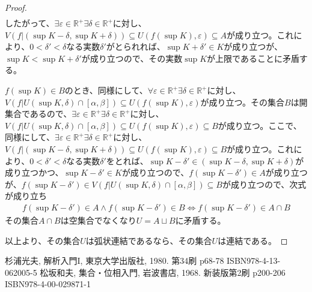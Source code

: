 \documentclass[dvipdfmx]{jsarticle}
\begin{document}
\begin{proof}
\begin{align*}
\end{align*}
したがって、$\exists\varepsilon \in \mathbb{R}^{+}\exists\delta \in \mathbb{R}^{+}$に対し、$V\left( f|\left( \sup K - \delta,\sup K + \delta \right) \right) \subseteq U\left( f\left( \sup K \right),\varepsilon \right) \subseteq A$が成り立つ。これにより、$0 < \delta' < \delta$なる実数$\delta'$がとられれば、$\sup K + \delta' \in K$が成り立つが、$\sup K < \sup K + \delta'$が成り立つので、その実数$\sup K$が上限であることに矛盾する。\par
$f\left( \sup K \right) \in B$のとき、同様にして、$\forall\varepsilon \in \mathbb{R}^{+}\exists\delta \in \mathbb{R}^{+}$に対し、$V\left( f|U\left( \sup K,\delta \right) \cap [\alpha,\beta] \right) \subseteq U\left( f\left( \sup K \right),\varepsilon \right)$が成り立つ。その集合$B$は開集合であるので、$\exists\varepsilon \in \mathbb{R}^{+}\exists\delta \in \mathbb{R}^{+}$に対し、$V\left( f|U\left( \sup K,\delta \right) \cap [\alpha,\beta] \right) \subseteq U\left( f\left( \sup K \right),\varepsilon \right) \subseteq B$が成り立つ。ここで、同様にして、$\exists\varepsilon \in \mathbb{R}^{+}\exists\delta \in \mathbb{R}^{+}$に対し、$V\left( f|\left( \sup K - \delta,\sup K + \delta \right) \right) \subseteq U\left( f\left( \sup K \right),\varepsilon \right) \subseteq B$が成り立つ。これにより、$0 < \delta' < \delta$なる実数$\delta'$をとれば、$\sup K - \delta' \in \left( \sup K - \delta,\sup K + \delta \right)$が成り立つかつ、$\sup K - \delta' \in K$が成り立つので、$f\left( \sup K - \delta' \right) \in A$が成り立つが、$f\left( \sup K - \delta' \right) \in V\left( f|U\left( \sup K,\delta \right) \cap [\alpha,\beta] \right) \subseteq B$が成り立つので、次式が成り立ち
\begin{align*}
f\left( \sup K - \delta' \right) \in A \land f\left( \sup K - \delta' \right) \in B \Leftrightarrow f\left( \sup K - \delta' \right) \in A \cap B
\end{align*}
その集合$A \cap B$は空集合でなくなり$U = A \sqcup B$に矛盾する。\par
以上より、その集合$U$は弧状連結であるなら、その集合$U$は連結である。
\end{proof}
\begin{thebibliography}{50}
  杉浦光夫, 解析入門I, 東京大学出版社, 1980. 第34刷 p68-78 ISBN978-4-13-062005-5
  松坂和夫, 集合・位相入門, 岩波書店, 1968. 新装版第2刷 p200-206 ISBN978-4-00-029871-1
\end{thebibliography}
\end{document}
